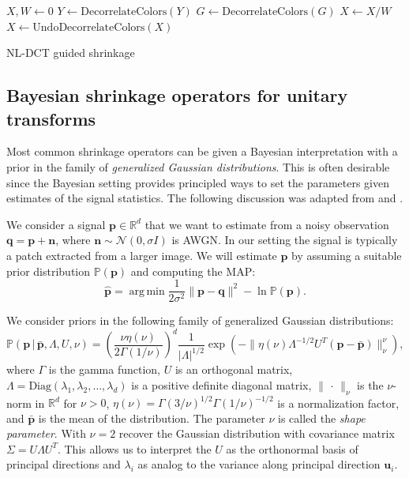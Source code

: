 \documentclass{ipol}
\newcommand{\ma}[1]{\boldsymbol{#1}}
\DeclareMathOperator*{\argmin}{arg\,min}
\begin{document}
\begin{algorithm}
\DontPrintSemicolon
{}
$X, W \gets  0$\;
$Y \gets   \text{DecorrelateColors}(Y)$\;
$G \gets   \text{DecorrelateColors}(G)$\;
$ X \gets  X / W$ \;
$X \gets   \text{UndoDecorrelateColors}(X)$\;
\caption{NL-DCT guided shrinkage}
\label{alg:nldct2}
\end{algorithm}

\subsection{Bayesian shrinkage operators for unitary transforms}

Most common shrinkage operators can be given a Bayesian interpretation with a
prior in the family of \emph{generalized Gaussian distributions}. This is often 
desirable since the Bayesian setting provides principled ways to set the parameters
given estimates of the signal statistics.
The following discussion was adapted from \cite{Moulin1999} and \cite{Elad2006shrinkage}.

We consider a signal $\ma p\in\mathbb R^d$ that we want to estimate from a
noisy observation $\ma q = \ma p + \ma n$, where $\ma n \sim \mathcal
N(0,\sigma I)$ is AWGN. In our setting the signal is typically a patch
extracted from a larger image. We will estimate $\ma p$ by assuming a suitable
prior distribution $\mathbb P(\ma p)$ and computing the MAP:
\[\hat{\ma p} = \argmin \frac1{2\sigma^2}\|\ma p - \ma q\|^2 - \ln \mathbb P(\ma p).\]

We consider priors in the following family of generalized Gaussian distributions:
\begin{equation}
	\mathbb P(\ma p\,|\,\bar{\ma p}, \Lambda, U, \nu) = 
	\left(\frac{\nu\eta(\nu)}{2\Gamma(1/\nu)}\right)^d\frac1{|\Lambda|^{1/2}}
	\exp\left(-\|\eta(\nu)\Lambda^{-1/2}U^T(\ma p - \bar{\ma p}) \|_{\nu}^\nu\right),
	\label{eeq:ggd-family}
\end{equation}
where $\Gamma$ is the gamma function, 
$U$ is an orthogonal matrix,
$\Lambda = \text{Diag}(\lambda_1,\lambda_2,\dots,\lambda_d)$ is a positive
definite diagonal matrix, $\|\,\cdot\,\|_\nu$ is the $\nu$-norm in $\mathbb
R^d$ for $\nu > 0$, 
$\eta(\nu) = \Gamma(3/\nu)^{1/2}\Gamma(1/\nu)^{-1/2}$
is a normalization factor, 
and $\bar{\ma p}$ is the mean of the distribution.  The
parameter $\nu$ is called the \emph{shape parameter}. With $\nu = 2$
recover the Gaussian distribution with covariance matrix $\Sigma = U\Lambda U^T$.
This allows us to interpret the $U$ as the orthonormal basis of principal
directions and $\lambda_i$ as analog to the variance along principal direction $\ma u_i$.
\end{document}
